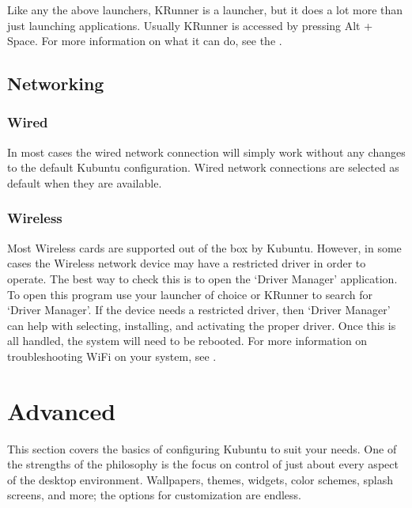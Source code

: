 \documentclass[letterpaper,10pt,english]{sphinxmanual}
\begin{document}
\sphinxAtStartPar
Like any the above launchers, KRunner is a launcher, but it does a lot more than just launching applications. Usually KRunner is accessed by pressing Alt + Space. For more information on what it can do, see the .


\section{Networking}
\label{\detokenize{docs/basic:networking}}


\subsection{Wired}
\label{\detokenize{docs/basic:wired}}
\sphinxAtStartPar
In most cases the wired network connection will simply work without any changes to the default Kubuntu configuration. Wired network connections are selected as default when they are available.


\subsection{Wireless}
\label{\detokenize{docs/basic:wireless}}
\sphinxAtStartPar
Most Wireless cards are supported out of the box by Kubuntu. However, in some cases the Wireless network device may have a restricted driver in order to operate. The best way to check this is to open the ‘Driver Manager’ application. To open this program use your launcher of choice or KRunner to search for ‘Driver Manager’. If the device needs a restricted driver, then ‘Driver Manager’ can help with selecting, installing, and activating the proper driver. Once this is all handled, the system will need to be rebooted. For more information on troubleshooting Wi\sphinxhyphen{}Fi on your system, see .

\sphinxAtStartPar
{\hyperref[\detokenize{docs/basic:basic}]{}}


\chapter{Advanced}
\label{\detokenize{docs/advanced:advanced}}\label{\detokenize{docs/advanced:advanced-link}}\label{\detokenize{docs/advanced::doc}}
\sphinxAtStartPar
This section covers the basics of configuring Kubuntu to suit your needs. One of the strengths of the  philosophy is the focus on control of just about every aspect of the desktop environment. Wallpapers, themes, widgets, color schemes, splash screens, and more; the options for customization are endless.
\end{document}
